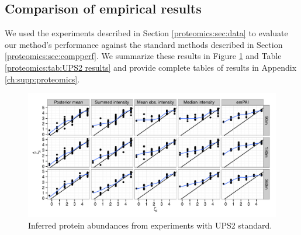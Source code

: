 
\subsection{Comparison of empirical results}
\label{proteomics:sec:dataanalysis}

We used the experiments described in Section \ref{proteomics:sec:data} to evaluate our method's performance against the standard methods described in Section \ref{proteomics:sec:compperf}.
We summarize these results in Figure \ref{proteomics:fig:UPS2 results} and Table \ref{proteomics:tab:UPS2 results} and provide complete tables of results in Appendix \ref{ch:supp:proteomics}.
%
\begin{figure}
\centering
\includegraphics[width=\textwidth]{figures/proteomics/figures_draft_ups2}
\caption{Inferred protein abundances from experiments with UPS2 standard.
\label{proteomics:fig:UPS2 results}}
\end{figure}
%
